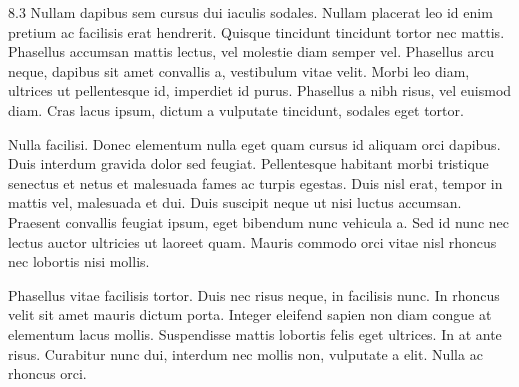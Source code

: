 \documentclass[a0]{a0poster}
\begin{document}
\framethin
\begin{area2}{8.3}
Nullam dapibus sem cursus dui iaculis sodales. Nullam placerat leo id enim pretium ac facilisis erat hendrerit. Quisque tincidunt tincidunt tortor nec mattis. Phasellus accumsan mattis lectus, vel molestie diam semper vel. Phasellus arcu neque, dapibus sit amet convallis a, vestibulum vitae velit. Morbi leo diam, ultrices ut pellentesque id, imperdiet id purus. Phasellus a nibh risus, vel euismod diam. Cras lacus ipsum, dictum a vulputate tincidunt, sodales eget tortor.

Nulla facilisi. Donec elementum nulla eget quam cursus id aliquam orci dapibus. Duis interdum gravida dolor sed feugiat. Pellentesque habitant morbi tristique senectus et netus et malesuada fames ac turpis egestas. Duis nisl erat, tempor in mattis vel, malesuada et dui. Duis suscipit neque ut nisi luctus accumsan. Praesent convallis feugiat ipsum, eget bibendum nunc vehicula a. Sed id nunc nec lectus auctor ultricies ut laoreet quam. Mauris commodo orci vitae nisl rhoncus nec lobortis nisi mollis.


Phasellus vitae facilisis tortor. Duis nec risus neque, in facilisis nunc. In rhoncus velit sit amet mauris dictum porta. Integer eleifend sapien non diam congue at elementum lacus mollis. Suspendisse mattis lobortis felis eget ultrices. In at ante risus. Curabitur nunc dui, interdum nec mollis non, vulputate a elit. Nulla ac rhoncus orci. 
\end{area2}

\end{document}
